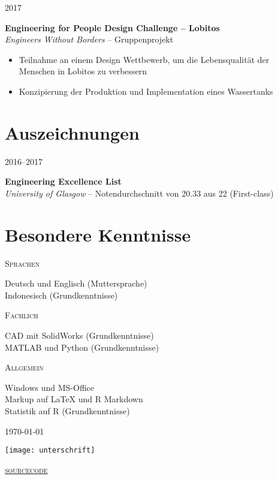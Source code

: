 \documentclass[a4paper]{article}
\newcommand{\entry}[4]{

	\begin{minipage}[t]{.20\textwidth}
		\hfill \textsc{#1}

	\end{minipage}
	\hfill\vline\hfill
	\begin{minipage}[t]{.75\textwidth}
		\textbf{#2}\\ 
		\textit{#3}    
		#4

	\end{minipage} 
	\vspace{.25cm}

}
\newcommand{\nentry}[2]{

	\begin{minipage}[t]{.20\textwidth}
		\hfill \textsc{#1}

	\end{minipage}
	\hfill\vline\hfill
	\begin{minipage}[t]{.75\textwidth}
		#2 

	\end{minipage}
	\vspace{.25cm} 

}
\begin{document}
\entry{2017}{Engineering for People Design Challenge -- Lobitos}{Engineers Without Borders}{-- Gruppenprojekt\vspace{-.25cm}
	\begin{itemize}[leftmargin=*]
		\setlength{\itemsep}{-3pt}
	\item Teilnahme an einem Design Wettbewerb, um die Lebensqualit{\"a}t der \newline\phantom{W}Menschen in Lobitos zu verbessern
	\item Konzipierung der Produktion und Implementation eines Wassertanks
	\end{itemize}
}

\section{Auszeichnungen}

\entry{2016--2017}{Engineering Excellence List}{University of Glasgow}{-- Notendurchschnitt von 20.33 aus 22 (First-class)}

\section{Besondere Kenntnisse}

\nentry{Sprachen}{Deutsch und Englisch (Muttersprache)\\Indonesisch (Grundkenntnisse)}

\nentry{Fachlich}{CAD mit SolidWorks (Grundkenntnisse)\\MATLAB und Python (Grundkenntnisse)}

\nentry{Allgemein}{Windows und MS-Office\\Markup auf {\LaTeX} und R Markdown\\Statistik auf R (Grundkenntnisse)}

\vspace*{\fill} 
\begin{minipage}{0.4\textwidth}
	\today
\end{minipage}
\begin{minipage}{0.19\textwidth}
	\centering
	\hspace{-50mm}\texttt{[image: unterschrift]}
\end{minipage}
\begin{minipage}{0.4\textwidth}
	\flushright
	\href{https://github.com/emfiedler/cv/blob/master/CV.tex}{\textsc{sourcecode}}
\end{minipage}
\end{document}
